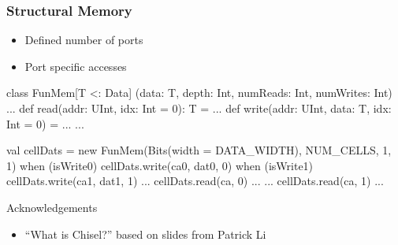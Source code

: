 \documentclass[xcolor=pdflatex,dvipsnames,table]{beamer}
\begin{document}


\begin{frame}[fragile]
\frametitle{Structural Memory}
\begin{itemize}
\item Defined number of ports
\item Port specific accesses
\end{itemize}
\begin{scala}
class FunMem[T <: Data]
    (data: T, depth: Int, numReads: Int, numWrites: Int) {
  ...
  def read(addr: UInt, idx: Int = 0): T = ...
  def write(addr: UInt, data: T, idx: Int = 0) = ...
  ...
}
\end{scala}
\begin{scala}
val cellDats = new FunMem(Bits(width = DATA_WIDTH), NUM_CELLS, 1, 1)
when (isWrite0) {
  cellDats.write(ca0, dat0, 0)
}
when (isWrite1) {
  cellDats.write(ca1, dat1, 1)
}
... cellDats.read(ca, 0) ...
... cellDats.read(ca, 1) ...
\end{scala}
\end{frame}

\begin{frame}{Acknowledgements}
\begin{itemize}
\item ``What is Chisel?'' based on slides from Patrick Li
\end{itemize}
\end{frame}
\end{document}
